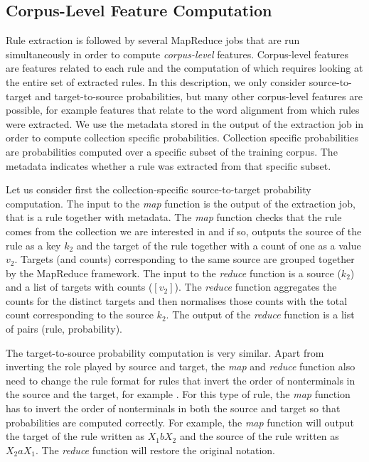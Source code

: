 \subsection{Corpus-Level Feature Computation} \label{sec:corpusLevelFeatureComputation}
Rule extraction is followed by several MapReduce jobs that are run simultaneously
in order to
compute \emph{corpus-level} features. Corpus-level features
are features related
to each rule and the computation of which requires looking at the entire set of
extracted rules. In this description, we only consider source-to-target and
target-to-source probabilities, but many other corpus-level features are possible,
for example features that relate to the word alignment from which rules were
extracted. We use the metadata stored in the output of the
extraction job in order to compute collection specific probabilities.
Collection specific probabilities are probabilities computed over a specific subset
of the training corpus. The metadata indicates whether a rule was extracted from
that specific subset.

Let us
consider first the collection-specific source-to-target probability computation.
The input to the \emph{map} function
is the output of the extraction job, that is a rule together with metadata.
The \emph{map} function checks that the rule comes from the collection we are
interested in and if so, outputs the source of the rule as a key $k_2$ and the
target of the rule together with a count of one as a value $v_2$. Targets (and
counts) corresponding to the same source are grouped together by the MapReduce
framework. The input to the \emph{reduce} function is a source ($k_2$) and
a list of targets with counts ($[v_2]$). The \emph{reduce} function aggregates
the counts for the distinct targets and then normalises those counts with the
total count corresponding to the source $k_2$. The output of the \emph{reduce}
function is a list of pairs (rule, probability).

The target-to-source probability computation is very similar. Apart from
inverting the role played by source and target, the \emph{map} and \emph{reduce}
function also need to change the rule format for
rules that invert the order of nonterminals in the source
and the target, for example \RT[$X$][$X_1 a X_2$][$X_2 b X_1$].
For this
type of rule, the \emph{map} function has to invert the order of nonterminals
in both the source and target so that probabilities are computed correctly. For
example, the \emph{map} function will output the target of the rule
written as $X_1 b X_2$ and the source of the rule
written as $X_2 a X_1$. The \emph{reduce} function
will restore the original notation.

